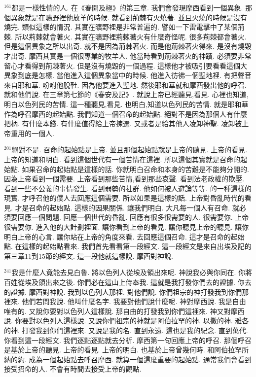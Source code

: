 \documentclass{book}
\begin{document}
$^{161}$都是一樣性情的人.
在《春開及極》的第三章.
我們會發現摩西看到一個異象.
那個異象就是在曠野裡他放羊的時候.
就看到荊棘有火燒著.
並且火燒的時候是沒有燒完.
類似這樣的情況.
其實在曠野裡是非常普遍的.
譬如一下雷電擊中了某個荊棘.
所以荊棘就會著火.
其實在曠野裡荊棘著火有什麼奇怪呢.
很多荊棘都會著火.
但是這個異象之所以出奇.
就不是因為荊棘著火.
而是他荊棘著火得來.
是沒有燒毀才出奇.
摩西其實是一個很專業的牧羊人.
他當時看到荊棘著火的神蹟.
必須要非常留心才看得到荊棘著火.
但是沒有燒毀的一個過程.
這樣他才被吸引要看看這個大異象到底是怎樣.
當他進入這個異象當中的時候.
他進入彷彿一個聖地裡.
有把聲音來自耶和華.
吩咐他脫鞋.
因為他要進入聖地.
然後耶和華就和摩西發出他的呼召.
就和他們說.
在三章第七節的《春安及記》.
就說上帝已經聽見,看見.
心裡也知道,明白以色列民的苦情.
這一種聽見,看見.
也明白,知道以色列民的苦情.
就是耶和華作為呼召摩西的起始點.
我們知道一個召命的起始點.
絕對不是因為那個人有什麼把柄.
有什麼本錢.
有什麼值得給上帝揀選.
又或者是給其他人凌卸神聖.
凌卸被上帝重用的一個人.

$^{201}$絕對不是.
召命的起始點是上帝.
並且那個起始點就是上帝的聽見.
上帝的看見.
上帝的知道和明白.
看到這個世代有一個苦情在這裡.
所以這個其實就是召命的起始點.
如果召命的起始點是這樣的話.
你就明白召命和本身的苦難是不能夠分開的.
因為上帝看到一個需要.
上帝看到那些苦情,看到那些哀聲.
看到法老政權的欺壓.
看到一些不公義的事情發生.
看到弱勢的社群.
他如何被人遊論等等.
的一種這樣的現實.
才呼召他的僕人去回應這個需要.
所以如果是這樣的話.
上帝對昏亂時代的看見.
才是召命的起始點.
這樣的因果關係.
讓我們明白.
大凡每一個人有召命.
就必須要回應一個問題.
回應一個世代的昏亂.
回應有很多很需要的人.
很需要你.
上帝很需要你.
進入他的大計劃裡面.
讓你看到上帝的看見.
讓你聽見上帝的聽見.
讓你明白上帝的心言.
讓你站在上帝的角度來看.
去回應這個召命.
這才是召命的起始點.
在這樣的起始點看來.
我們首先看看第一段經文.
這一段經文是來自出埃及記的第三章11到15節的經文.
這一段他就這樣說.
摩西對神說.

$^{241}$我是什麼人竟能去見白魯.
將以色列人從埃及領出來呢.
神說我必與你同在.
你將百姓從埃及領出來之後.
你們必在這山上侍奉我.
這就是我打發你們去的證據.
你去的證據.
摩西對神說.
我到以色列人那裡.
對他們說.
你們祖宗的神打發我到你們那裡來.
他們若問我說.
他叫什麼名字.
我要對他們說什麼呢.
神對摩西說.
我是自由唯有的.
又說你要對以色列人這樣說.
那自由的打發我到你們這裡來.
神又對摩西說.
你要對以色列人這樣說.
又說你們祖宗的神就是阿伯拉罕的神.
以撒的神.
雅各的神.
打發我到你們這裡來.
又說是我的名.
直到永遠.
這也是我的紀念.
直到萬代.
你看到這一段經文.
我們逐點逐點就去分析.
摩西第一句回應上帝的呼召.
那個呼召是基於上帝的聽見.
上帝的看見.
上帝的明白.
也基於上帝曾幾何時.
和阿伯拉罕所納的約.
成為一個起始點去呼召摩西.
就算一個這麼重要的起始點.
通常我們會看到接受招命的人.
不會有時間去接受上帝的觀點.
\end{document}
